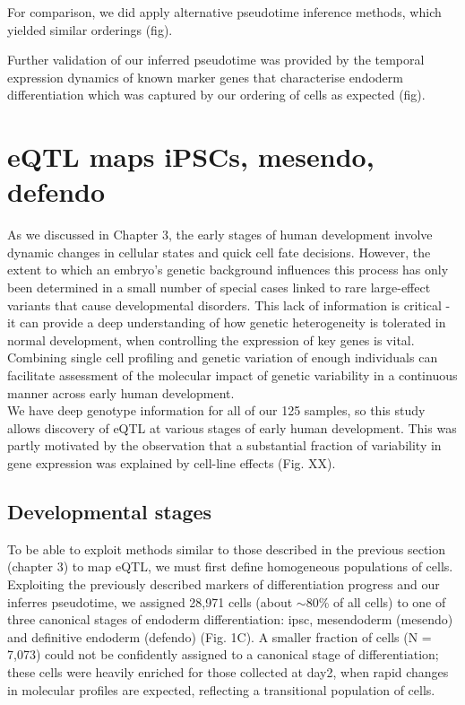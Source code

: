 For comparison, we did apply alternative pseudotime inference methods, which yielded similar orderings (fig).
 
Further validation of our inferred pseudotime was provided by the temporal expression dynamics of known marker genes that characterise endoderm differentiation which was captured by our ordering of cells as expected (fig).




\section{eQTL maps iPSCs, mesendo, defendo}

As we discussed in Chapter 3, the early stages of human development involve dynamic changes in cellular states and quick cell fate decisions. 
However, the extent to which an embryo’s genetic background influences this process has only been determined in a small number of special cases linked to rare large-effect variants that cause developmental disorders. 
This lack of information is critical - it can provide a deep understanding of how genetic heterogeneity is tolerated in normal development, when controlling the expression of key genes is vital. 
Combining single cell profiling and genetic variation of enough individuals can facilitate assessment of the molecular impact of genetic variability in a continuous manner across early human development.\\
 
We have deep genotype information for all of our 125 samples, so this study allows discovery of eQTL at various stages of early human development. 
This was partly motivated by the observation that a substantial fraction of variability in gene expression was explained by cell-line effects (Fig. XX).

\subsection{Developmental stages}

To be able to exploit methods similar to those described in the previous section (chapter 3) to map eQTL, we must first define homogeneous populations of cells.
Exploiting the previously described markers of differentiation progress and our inferres pseudotime, we assigned 28,971 cells (about $\sim$80\% of all cells) to one of three canonical stages of endoderm differentiation: \gls{ipsc}, mesendoderm (mesendo) and definitive endoderm (defendo) (Fig. 1C). 
A smaller fraction of cells (N = 7,073) could not be confidently assigned to a canonical stage of differentiation; these cells were heavily enriched for those collected at day2, when rapid changes in molecular profiles are expected, reflecting a transitional population of cells.

